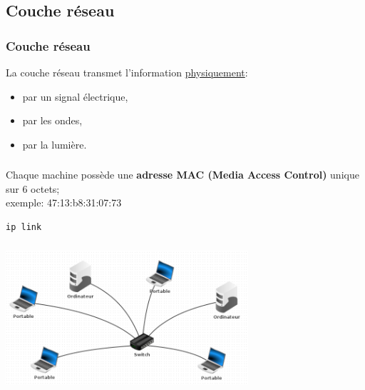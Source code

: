 \documentclass[svgnames,11pt]{beamer}
\begin{document}
\subsection{Couche réseau}
\begin{frame}
    \frametitle{Couche réseau}

    \begin{aretenir}[]
        La couche réseau transmet l'information \underline{physiquement}:
        \begin{itemize}
            \item par un signal électrique,
            \item par les ondes,
            \item par la lumière.
        \end{itemize}
    \end{aretenir}

\end{frame}
\begin{frame}[fragile]
    \frametitle{}

    \begin{aretenir}[]
        Chaque machine possède une \textbf{adresse MAC (Media Access Control)} unique sur 6 octets; \\exemple: 47:13:b8:31:07:73
    \end{aretenir}
    \begin{center}
        \begin{lstlisting}[language=Bash,basicstyle=\ttfamily\small , xleftmargin=1em, xrightmargin=1em]
ip link
\end{lstlisting}
        \label{CODE}
    \end{center}
\end{frame}
\begin{frame}
    \frametitle{}


    \begin{center}
        \centering
        \includegraphics[width=9cm]{ressources/local.png}
        \label{IMG}
    \end{center}

\end{frame}
\end{document}

